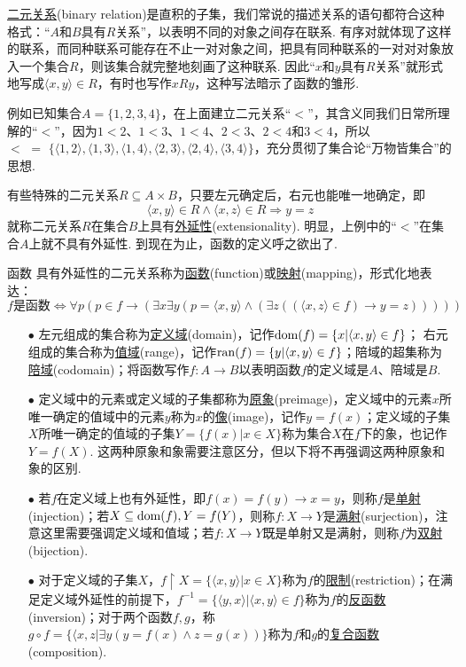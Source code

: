 \documentclass[main.tex]{subfiles}
\begin{document}
\uline{二元关系}(binary relation)是直积的子集，我们常说的描述关系的语句都符合这种格式：“\(A\)和\(B\)具有\(R\)关系”，以表明不同的对象之间存在联系. 有序对就体现了这样的联系，而同种联系可能存在不止一对对象之间，把具有同种联系的一对对对象放入一个集合\(R\)，则该集合就完整地刻画了这种联系. 因此“\(x\)和\(y\)具有\(R\)关系”就形式地写成\(\langle x,y \rangle \in R\)，有时也写作\(xRy\)，这种写法暗示了函数的雏形.

例如已知集合\(A=\{1,2,3,4\}\)，在上面建立二元关系“\(<\)”，其含义同我们日常所理解的“\(<\)”，因为\(1<2\)、\(1<3\)、\(1<4\)、\(2<3\)、\(2<4\)和\(3<4\)，所以\(<\,\,=\,\,\{\langle 1,2 \rangle,\langle 1,3 \rangle,\langle 1,4 \rangle,\langle 2,3 \rangle,\langle 2,4 \rangle,\langle 3,4 \rangle\}\)，充分贯彻了集合论“万物皆集合”的思想.

有些特殊的二元关系\(R \subseteq A \times B\)，只要左元确定后，右元也能唯一地确定，即
\[\langle x,y \rangle \in R \wedge \langle x,z \rangle \in R \Rightarrow y=z\]
就称二元关系\(R\)在集合\(B\)上具有\uline{外延性}(extensionality). 明显，上例中的“\(<\)”在集合\(A\)上就不具有外延性. 到现在为止，函数的定义呼之欲出了.

\begin{definition}{函数}
    具有外延性的二元关系称为\uline{函数}(function)或\uline{映射}(mapping)，形式化地表达：
    \[f \mbox{是函数} \Longleftrightarrow \forall p (p \in f \rightarrow (\exists x \exists y(p = \langle x,y \rangle \wedge (\exists z((\langle x,z \rangle \in f) \rightarrow y=z)))))\]
    \begin{itemize}
        \item [\(\bullet\)] 左元组成的集合称为\uline{定义域}(domain)，记作\({\rm dom}(f)= \{x | \langle x,y \rangle \in f\}\)； 右元组成的集合称为\uline{值域}(range)，记作\({\rm ran}(f)= \{y | \langle x,y \rangle \in f\}\)；陪域的超集称为\uline{陪域}(codomain)；将函数写作\(f:A \to B\)以表明函数\(f\)的定义域是\(A\)、陪域是\(B\).
        \item [\(\bullet\)] 定义域中的元素或定义域的子集都称为\uline{原象}(preimage)，定义域中的元素\(x\)所唯一确定的值域中的元素\(y\)称为\(x\)的\uline{像}(image)，记作\(y=f(x)\)；定义域的子集\(X\)所唯一确定的值域的子集\(Y=\{f(x)|x \in X\}\)称为集合\(X\)在\(f\)下的象，也记作\(Y=f(X)\). 这两种原象和象需要注意区分，但以下将不再强调这两种原象和象的区别.
        \item [\(\bullet\)] 若\(f\)在定义域上也有外延性，即\(f(x)=f(y) \rightarrow x=y\)，则称\(f\)是\uline{单射}(injection)；若\(X\subseteq{\rm dom}(f), Y=f(Y)\)，则称\(f:X\to Y\)是\uline{满射}(surjection)，注意这里需要强调定义域和值域；若\(f:X \to Y\)既是单射又是满射，则称\(f\)为\uline{双射}(bijection).
        \item [\(\bullet\)] 对于定义域的子集\(X\)，\(f\upharpoonright X=\{\langle x,y \rangle|x \in X\}\)称为\(f\)的\uline{限制}(restriction)；在满足定义域外延性的前提下，\(f^{-1}=\{\langle y,x \rangle | \langle x,y \rangle \in f\}\)称为\(f\)的\uline{反函数}(inversion)；对于两个函数\(f,g\)，称\(g \circ f = \{\langle x,z | \exists y(y=f(x) \wedge z=g(x))\}\)称为\(f\)和\(g\)的\uline{复合函数}(composition).
    \end{itemize}
\end{definition}
\end{document}
